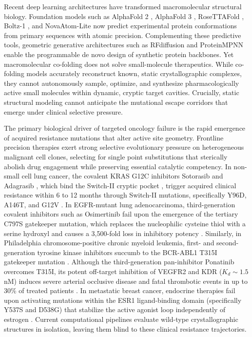 \documentclass[11pt,a4paper]{article}
\begin{document}
Recent deep learning architectures have transformed macromolecular structural biology. Foundation models such as AlphaFold 2 \cite{jumper2021highly}, AlphaFold 3 \cite{abramson2024accurate}, RoseTTAFold \cite{baek2021accurate,krishna2024rosettafold}, Boltz-1 \cite{wohlwend2024boltz1}, and NovaAtom-Lite \cite{geodesic2026novaatom} now predict experimental protein conformations from primary sequences with atomic precision. Complementing these predictive tools, geometric generative architectures such as RFdiffusion \cite{watson2023rfdiffusion} and ProteinMPNN \cite{dauparas2022proteinmpnn} enable the programmable de novo design of synthetic protein backbones. Yet macromolecular co-folding does not solve small-molecule therapeutics. While co-folding models accurately reconstruct known, static crystallographic complexes, they cannot autonomously sample, optimize, and synthesize pharmacologically active small molecules within dynamic, cryptic target cavities. Crucially, static structural modeling cannot anticipate the mutational escape corridors that emerge under clinical selective pressure.

The primary biological driver of targeted oncology failure is the rapid emergence of acquired resistance mutations that alter active site geometry. Frontline precision therapies exert strong selective evolutionary pressure on heterogeneous malignant cell clones, selecting for single point substitutions that sterically abolish drug engagement while preserving essential catalytic competency. In non-small cell lung cancer, the covalent KRAS G12C inhibitors Sotorasib \cite{canon2019clinical} and Adagrasib \cite{hallin2020kras}, which bind the Switch-II cryptic pocket \cite{ostrem2013kras}, trigger acquired clinical resistance within 6 to 12 months through Switch-II mutations, specifically Y96D, A146T, and G12V \cite{tanaka2021clinical,awad2021acquired}. In EGFR-mutant lung adenocarcinoma, third-generation covalent inhibitors such as Osimertinib \cite{janne2015azn9291} fail upon the emergence of the tertiary C797S gatekeeper mutation, which replaces the nucleophilic cysteine thiol with a serine hydroxyl and causes a 3,500-fold loss in inhibitory potency \cite{thress2015acquired,niederst2015mechanisms}. Similarly, in Philadelphia chromosome-positive chronic myeloid leukemia, first- and second-generation tyrosine kinase inhibitors succumb to the BCR-ABL1 T315I gatekeeper mutation \cite{shah2004overriding}. Although the third-generation pan-inhibitor Ponatinib overcomes T315I, its potent off-target inhibition of VEGFR2 and KDR ($K_d \sim 1.5$\,nM) induces severe arterial occlusive disease and fatal thrombotic events in up to 30\% of treated patients \cite{cortes2013safety,moslehi2015revisiting}. In metastatic breast cancer, endocrine therapies fail upon activating mutations within the ESR1 ligand-binding domain (specifically Y537S and D538G) that stabilize the active agonist loop independently of estrogen \cite{toy2013esr1,robinson2013activating}. Current computational pipelines evaluate wild-type crystallographic structures in isolation, leaving them blind to these clinical resistance trajectories.
\end{document}
